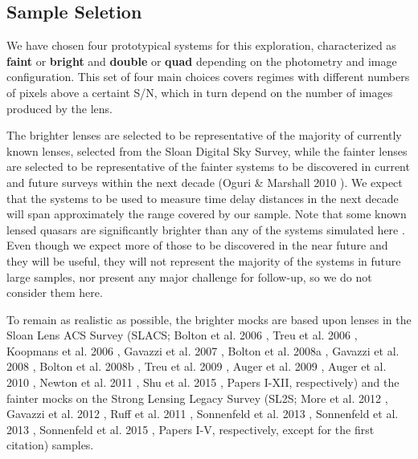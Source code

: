 \documentclass[a4paper,11pt]{article}
\begin{document}
\subsection{Sample Seletion}

We have chosen four prototypical systems for this exploration,
characterized as \textbf{faint} or \textbf{bright} and \textbf{double}
or \textbf{quad} depending on the photometry and image
configuration. This set of four main choices covers regimes with
different numbers of pixels above a certaint S/N, which in turn depend
on the number of images produced by the lens.


The brighter lenses are selected to be representative of the majority
of currently known lenses, selected from the Sloan Digital Sky Survey,
while the fainter lenses are selected to be representative of the
fainter systems to be discovered in current and future surveys within
the next decade (Oguri \& Marshall 2010
\cite{2010MNRAS.405.2579O}). We expect that the systems to be used to
measure time delay distances in the next decade will span
approximately the range covered by our sample. Note that some known
lensed quasars are significantly brighter than any of the systems
simulated here \cite[e.g.,][]{1992MNRAS.259P...1P}. Even though we
expect more of those to be discovered in the near future and they will
be useful, they will not represent the majority of the systems in
future large samples, nor present any major challenge for follow-up,
so we do not consider them here.

To remain as realistic as possible, the brighter mocks are based upon
lenses in the Sloan Lens ACS Survey (SLACS; Bolton et al. 2006
\cite{2006ApJ...638..703B}, Treu et al. 2006
\cite{2006ApJ...640..662T}, Koopmans et al. 2006
\cite{2006ApJ...649..599K}, Gavazzi et al. 2007
\cite{2007ApJ...667..176G}, Bolton et al. 2008a
\cite{2008ApJ...682..964B}, Gavazzi et al. 2008
\cite{2008ApJ...677.1046G}, Bolton et al. 2008b
\cite{2008ApJ...684..248B}, Treu et al. 2009
\cite{2009ApJ...690..670T}, Auger et al. 2009
\cite{2009ApJ...705.1099A}, Auger et al. 2010
\cite{2010ApJ...724..511A}, Newton et al. 2011
\cite{2011ApJ...734..104N}, Shu et al. 2015
\cite{2014arXiv1407.2240S}, Papers I-XII, respectively) and the fainter mocks on the Strong
Lensing Legacy Survey (SL2S; More et al. 2012
\cite{2012ApJ...749...38M}, Gavazzi et al. 2012 \cite{2012ApJ...761..170G},
Ruff et al. 2011 \cite{2011ApJ...727...96R}, Sonnenfeld et al. 2013
\cite{2013ApJ...777...97S}, Sonnenfeld et al. 2013
\cite{2013ApJ...777...98S}, Sonnenfeld et al. 2015
\cite{2015ApJ...800...94S}, Papers I-V, respectively, except for the
first citation) samples.
\end{document}
